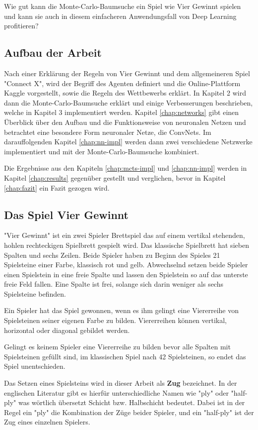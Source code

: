 \bigskip
Wie gut kann die Monte-Carlo-Baumsuche ein Spiel wie Vier Gewinnt spielen und kann sie auch in diesem einfacheren Anwendungsfall von Deep Learning profitieren? 

\subsection{Aufbau der Arbeit}
Nach einer Erklärung der Regeln von Vier Gewinnt und dem allgemeineren Spiel "Connect X", wird der Begriff des Agenten definiert und die Online-Plattform Kaggle vorgestellt, sowie die Regeln des Wettbewerbs erklärt. In Kapitel 2 wird dann die Monte-Carlo-Baumsuche erklärt und einige Verbesserungen beschrieben, welche in Kapitel 3 implementiert werden. Kapitel \ref{chap:networks} gibt einen Überblick über den Aufbau und die Funktionsweise von neuronalen Netzen und betrachtet eine besondere Form neuronaler Netze, die ConvNets. Im darauffolgenden Kapitel \ref{chap:nn-impl} werden dann zwei verschiedene Netzwerke implementiert und mit der Monte-Carlo-Baumsuche kombiniert.

Die Ergebnisse aus den Kapiteln \ref{chap:mcts-impl} und \ref{chap:nn-impl} werden in Kapitel \ref{chap:results} gegenüber gestellt und verglichen, bevor in Kapitel \ref{chap:fazit} ein Fazit gezogen wird.

\subsection{Das Spiel Vier Gewinnt}
"Vier Gewinnt" ist ein zwei Spieler Brettspiel das auf einem vertikal stehenden, hohlen rechteckigen Spielbrett gespielt wird. Das klassische Spielbrett hat sieben Spalten und sechs Zeilen. Beide Spieler haben zu Beginn des Spieles 21 Spielsteine einer Farbe, klassisch rot und gelb. Abwechselnd setzen beide Spieler einen Spielstein in eine freie Spalte und lassen den Spielstein so auf das unterste freie Feld fallen. Eine Spalte ist frei, solange sich darin weniger als sechs Spielsteine befinden.

Ein Spieler hat das Spiel gewonnen, wenn es ihm gelingt eine Viererreihe von Spielsteinen seiner eigenen Farbe zu bilden. Viererreihen können vertikal, horizontal oder diagonal gebildet werden.

Gelingt es keinem Spieler eine Viererreihe zu bilden bevor alle Spalten mit Spielsteinen gefüllt sind, im klassischen Spiel nach 42 Spielsteinen, so endet das Spiel unentschieden.

Das Setzen eines Spielsteins wird in dieser Arbeit als \textbf{Zug} bezeichnet. In der englischen Literatur gibt es hierfür unterschiedliche Namen wie "ply" oder "half-ply" was wörtlich übersetzt Schicht bzw. Halbschicht bedeutet. Dabei ist in der Regel ein "ply" die Kombination der Züge beider Spieler, und ein "half-ply" ist der Zug eines einzelnen Spielers.

